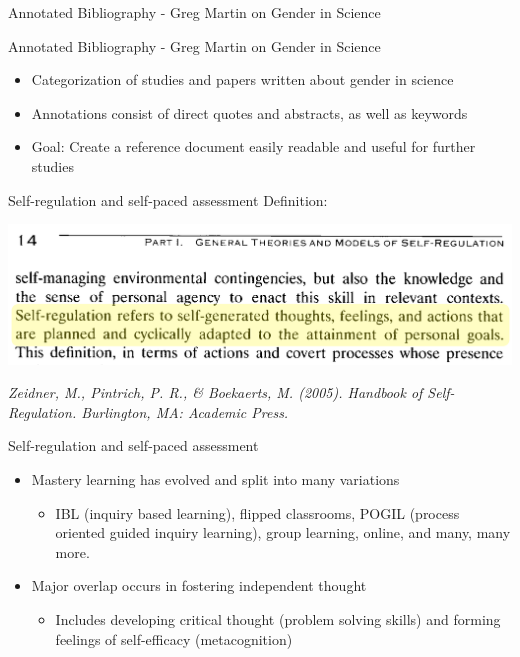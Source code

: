 \documentclass{beamer}
\begin{document}
\begin{frame}{Annotated Bibliography - Greg Martin on Gender in Science}
\begin{center}
\end{center}
\end{frame}
\begin{frame}{Annotated Bibliography - Greg Martin on Gender in Science}
  \begin{itemize}
    \item Categorization of studies and papers written about gender in science
    \item Annotations consist of direct quotes and abstracts, as well as keywords
    \item Goal: Create a reference document easily readable and useful for further studies
  \end{itemize}
\end{frame}
\begin{frame}{Self-regulation and self-paced assessment}
  Definition:
  \begin{center}
    \includegraphics[scale=0.4]{selfregdef}
  \end{center}
  \hfill \begin{minipage}[]{7cm}
      \emph{\tiny Zeidner, M., Pintrich, P. R., \& Boekaerts, M. (2005). Handbook of Self-Regulation. Burlington, MA: Academic Press.}
\end{minipage}

\end{frame}
\begin{frame}{Self-regulation and self-paced assessment}\pause
  \begin{itemize}
    \item Mastery learning has evolved and split into many variations
    \begin{itemize}
      \item IBL (inquiry based learning), flipped classrooms, POGIL (process oriented guided inquiry learning), group learning, online, and many, many more.
    \end{itemize}\pause
    \item Major overlap occurs in fostering independent thought
    \begin{itemize}
      \item Includes developing critical thought (problem solving skills) and forming feelings of self-efficacy (metacognition)
    \end{itemize}
  \end{itemize}
\end{frame}
\end{document}
